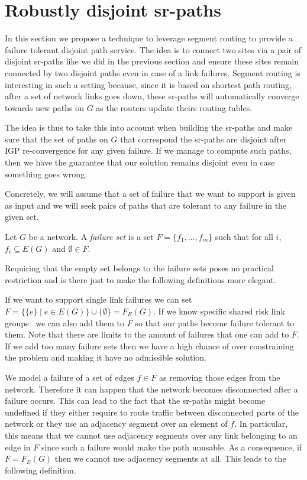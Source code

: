 \section{Robustly disjoint sr-paths}
\label{section:rdp}

In this section we propose a technique to leverage segment routing to provide a failure
tolerant disjoint path service. The idea is to connect two sites via a pair of 
disjoint sr-paths like we did in the previous section and ensure these sites remain connected by two disjoint paths
even in case of a link failures. Segment routing is interesting in such
a setting because, since it is based on shortest path routing, after a set
of network links goes down, these sr-paths will automatically converge towards new paths on $G$
as the routers update theirs routing tables. 

The idea is thus to take this into account when building the sr-paths and 
make sure that the set of paths on $G$ that correspond the sr-paths are disjoint
after IGP re-convergence for any given failure. If we manage to compute such paths, then we have the guarantee
that our solution remains disjoint even in case something goes wrong.

Concretely, we will assume that a set of failure that we want to support is
given as input and we will seek pairs of paths that are tolerant to any 
failure in the given set.

\begin{definition}
Let $G$ be a network. A \emph{failure set} is a set $F = \{f_1, \ldots, f_m\}$ such that
for all $i$, $f_i \subseteq E(G)$ and $\emptyset \in F$.
\end{definition}

Requiring that the empty set belongs to the failure sets poses no practical restriction
and is there just to make the following definitions more elegant.

If we want to support single link failures we can set $F = \{ \{ e \} \mid e \in E(G) \} \cup \{ \emptyset \} = F_E(G)$.
If we know specific shared risk link groups~\cite{ghobadi-imc16,turner2010california} we can also add
them to $F$ so that our paths become failure tolerant to them.
Note that there are limits to the amount of failures that one can add to $F$. If we add too many
failure sets then we have a high chance of over constraining the problem and making it have no
admissible solution.

We model a failure of a set of edges $f \in F$ as removing those edges from the network. Therefore
it can happen that the network becomes disconnected after a failure occurs. This can lead to the fact
that the sr-paths might become undefined if they either require to route traffic between disconnected parts of the network
or they use an adjacency segment over an element of $f$. In particular, this means that we cannot use adjacency segments
over any link belonging to an edge in $F$ since such a failure would make the path unusable. As a consequence,
if $F = F_E(G)$ then we cannot use adjacency segments at all. This leads to the following definition.

